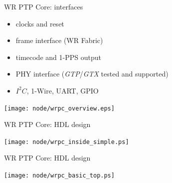\documentclass[compress,red]{beamer}
\newcommand{\backupend}{
   \addtocounter{framenumberappendix}{-\value{framenumber}}
   \addtocounter{framenumber}{\value{framenumberappendix}} 
}
\begin{document}
\begin{frame}{WR PTP Core: interfaces}
	\begin{itemize}
		\item clocks and reset
		\item frame interface (WR Fabric)
		\item timecode and 1-PPS output
		\item PHY interface (\emph{GTP}/\emph{GTX} tested and supported)
		\item $I^2C$, 1-Wire, UART, GPIO
	\end{itemize}
	\begin{center}
		\texttt{[image: node/wrpc\_overview.eps]}
	\end{center}
\end{frame}

\begin{frame}{WR PTP Core: HDL design}
	\begin{center}
	\texttt{[image: node/wrpc\_inside\_simple.ps]}
	\end{center}
\end{frame}
\begin{frame}{WR PTP Core: HDL design}
	\begin{center}
	\texttt{[image: node/wrpc\_basic\_top.ps]}
	\end{center}
\end{frame}


\backupend

\end{document}
